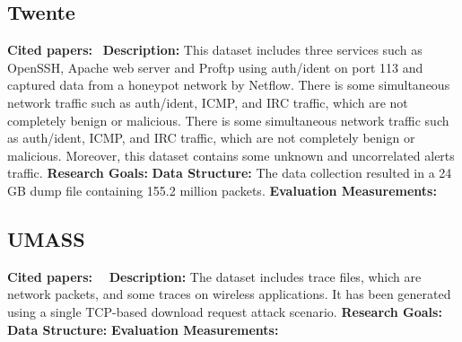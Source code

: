 \subsection{Twente}
\textbf{Cited papers:}~\cite{sperotto2009labeled} \newline
\textbf{Description:} This dataset includes three services such as OpenSSH, Apache web server and Proftp using auth/ident on port 113 and captured data from a honeypot network by Netflow. There is some simultaneous network traffic such as auth/ident, ICMP, and IRC traffic, which are not completely benign or malicious. There is some simultaneous network traffic such as auth/ident, ICMP, and IRC traffic, which are not completely benign or malicious. Moreover, this dataset contains some unknown and uncorrelated alerts traffic.\newline
\textbf{Research Goals:}  \newline
\textbf{Data Structure:} The data collection resulted in a 24 GB dump file containing 155.2 million packets. \newline
\textbf{Evaluation Measurements:} \newline


\subsection{UMASS}
\textbf{Cited papers:}~\cite{nehinbe2011critical}~\cite{prusty2011forensic} \newline
\textbf{Description:} The dataset includes trace files, which are network packets, and some traces on wireless applications. It has been generated using a single TCP-based download request attack scenario.\newline
\textbf{Research Goals:}  \newline
\textbf{Data Structure:} \newline
\textbf{Evaluation Measurements:} \newline



